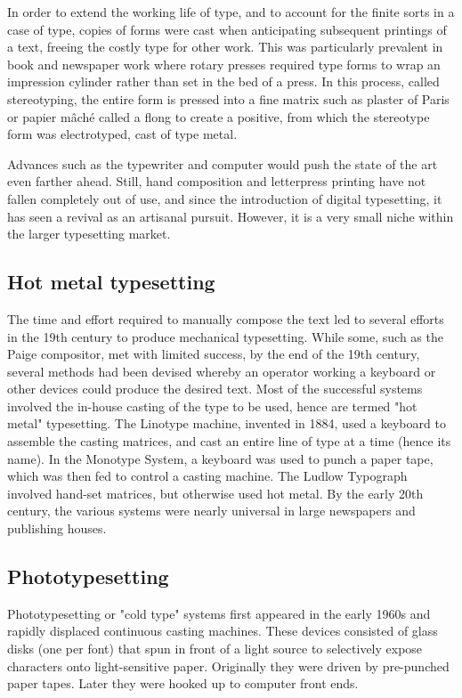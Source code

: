 \documentclass{article}
\begin{document}
In order to extend the working life of type, and to account for the finite sorts in a case of type, copies of forms were cast when anticipating subsequent printings of a text, freeing the costly type for other work. This was particularly prevalent in book and newspaper work where rotary presses required type forms to wrap an impression cylinder rather than set in the bed of a press. In this process, called stereotyping, the entire form is pressed into a fine matrix such as plaster of Paris or papier mâché called a flong to create a positive, from which the stereotype form was electrotyped, cast of type metal.

Advances such as the typewriter and computer would push the state of the art even farther ahead. Still, hand composition and letterpress printing have not fallen completely out of use, and since the introduction of digital typesetting, it has seen a revival as an artisanal pursuit. However, it is a very small niche within the larger typesetting market.

\subsection{Hot metal typesetting}

The time and effort required to manually compose the text led to several efforts in the 19th century to produce mechanical typesetting. While some, such as the Paige compositor, met with limited success, by the end of the 19th century, several methods had been devised whereby an operator working a keyboard or other devices could produce the desired text. Most of the successful systems involved the in-house casting of the type to be used, hence are termed "hot metal" typesetting. The Linotype machine, invented in 1884, used a keyboard to assemble the casting matrices, and cast an entire line of type at a time (hence its name). In the Monotype System, a keyboard was used to punch a paper tape, which was then fed to control a casting machine. The Ludlow Typograph involved hand-set matrices, but otherwise used hot metal. By the early 20th century, the various systems were nearly universal in large newspapers and publishing houses.

\subsection{Phototypesetting}

Phototypesetting or "cold type" systems first appeared in the early 1960s and rapidly displaced continuous casting machines. These devices consisted of glass disks (one per font) that spun in front of a light source to selectively expose characters onto light-sensitive paper. Originally they were driven by pre-punched paper tapes. Later they were hooked up to computer front ends.
\end{document}
